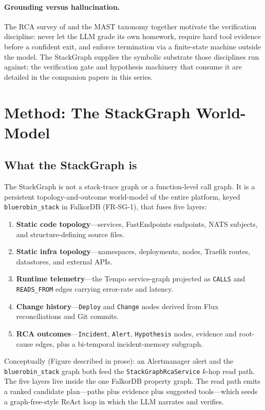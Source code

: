 \documentclass[11pt]{article}
\begin{document}
\paragraph{Grounding versus hallucination.}
The RCA survey of \citet{zhang2024survey} and the MAST taxonomy
\citep{cemri2025mast} together motivate the verification discipline: never let
the LLM grade its own homework, require hard tool evidence before a confident
exit, and enforce termination via a finite-state machine outside the model. The
StackGraph supplies the symbolic substrate those disciplines run against; the
verification gate and hypothesis machinery that consume it are detailed in the
companion papers in this series.

\section{Method: The StackGraph World-Model}

\subsection{What the StackGraph is}

The StackGraph is not a stack-trace graph or a function-level call graph. It is a
persistent topology-and-outcome world-model of the entire platform, keyed
\texttt{bluerobin\_stack} in FalkorDB (FR-SG-1), that fuses five layers:

\begin{enumerate}
  \item \textbf{Static code topology}---services, FastEndpoints endpoints, NATS
  subjects, and structure-defining source files.
  \item \textbf{Static infra topology}---namespaces, deployments, nodes, Traefik
  routes, datastores, and external APIs.
  \item \textbf{Runtime telemetry}---the Tempo service-graph projected as
  \texttt{CALLS} and \texttt{READS\_FROM} edges carrying error-rate and latency.
  \item \textbf{Change history}---\texttt{Deploy} and \texttt{Change} nodes
  derived from Flux reconciliations and Git commits.
  \item \textbf{RCA outcomes}---\texttt{Incident}, \texttt{Alert},
  \texttt{Hypothesis} nodes, evidence and root-cause edges, plus a bi-temporal
  incident-memory subgraph.
\end{enumerate}

Conceptually (Figure described in prose): an Alertmanager alert and the
\texttt{bluerobin\_stack} graph both feed the \texttt{StackGraphRcaService}
$k$-hop read path. The five layers live inside the one FalkorDB property graph.
The read path emits a ranked candidate plan---paths plus evidence plus suggested
tools---which seeds a graph-free-style ReAct loop in which the LLM narrates and
verifies.
\end{document}
